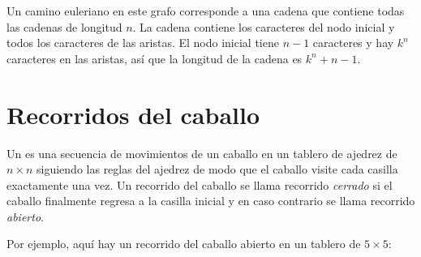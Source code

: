 \begin{center}
\end{center}

Un camino euleriano en este grafo corresponde a una cadena
que contiene todas las cadenas de longitud $n$.
La cadena contiene los caracteres del nodo inicial
y todos los caracteres de las aristas.
El nodo inicial tiene $n-1$ caracteres
y hay $k^n$ caracteres en las aristas,
así que la longitud de la cadena es $k^n+n-1$.

\section{Recorridos del caballo}


Un  es una secuencia de movimientos
de un caballo en un tablero de ajedrez de $n \times n$
siguiendo las reglas del ajedrez de modo que el caballo
visite cada casilla exactamente una vez.
Un recorrido del caballo se llama recorrido \emph{cerrado}
si el caballo finalmente regresa a la casilla inicial y
en caso contrario se llama recorrido \emph{abierto}.

Por ejemplo, aquí hay un recorrido del caballo abierto en un tablero de $5 \times 5$:

